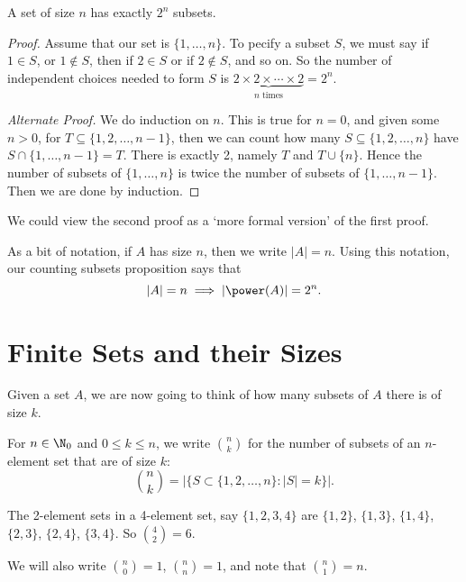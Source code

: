 \documentclass[a4paper]{scrreprt}
\begin{document}
\begin{proposition}
	A set of size $n$ has exactly $2^n$ subsets.
\end{proposition}
\begin{proof}
	Assume that our set is $\{1, \dots, n\}$. To pecify a subset $S$, we must say if $1 \in S$, or $1 \not\in S$, then if $2 \in S$ or if $2 \not\in S$, and so on. So the number of independent choices needed to form $S$ is $\underbrace{2 \times 2 \times \cdots \times 2}_{\text{$n$ times}} = 2^n$.

	\emph{Alternate Proof.}
	We do induction on $n$. This is true for $n = 0$, and given some $n > 0$, for $T \subseteq \{1, 2, \dots, n - 1\}$, then we can count how many $S \subseteq \{1, 2, \dots, n\}$ have $S \cap \{1, \dots, n - 1\} = T$. There is exactly 2, namely $T$ and $T \cup \{n\}$. Hence the number of subsets of $\{1, \dots, n\}$ is twice the number of subsets of $\{1, \dots, n - 1\}$. Then we are done by induction.
\end{proof}
\begin{remark}
	We could view the second proof as a `more formal version' of the first proof.
\end{remark}

As a bit of notation, if $A$ has size $n$, then we write $|A| = n$. Using this notation, our counting subsets proposition says that
$$
|A| = n \implies |\power(A)| = 2^n.
$$

\section{Finite Sets and their Sizes}

Given a set $A$, we are now going to think of how many subsets of $A$ there is of size $k$.

\begin{definition}
	For $n \in \N_0$ and $0 \leq k \leq n$, we write $\binom{n}{k}$ for the number of subsets of an $n$-element set that are of size $k$:
	$$
	\binom{n}{k} = \left|\{S \subset \{1, 2, \dots, n\} : |S| = k\}\right|.
	$$
\end{definition}

\begin{example}
	The 2-element sets in a 4-element set, say $\{1, 2, 3, 4\}$ are $\{1, 2\}$, $\{1, 3\}$, $\{1, 4\}$, $\{2, 3\}$, $\{2, 4\}$, $\{3, 4\}$. So $\binom{4}{2} = 6$.
\end{example}

We will also write $\binom{n}{0} = 1$, $\binom{n}{n} = 1$, and note that $\binom{n}{1} = n$.
\end{document}
